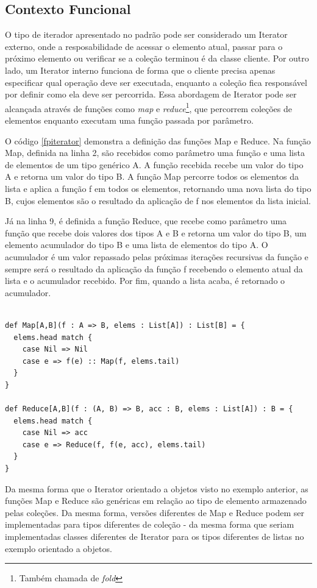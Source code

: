\subsection*{Contexto Funcional}

O tipo de iterador apresentado no padrão pode 
ser considerado um Iterator externo, onde a 
resposabilidade de acessar o elemento atual, 
passar para o próximo elemento ou verificar se 
a coleção terminou é da classe cliente. Por 
outro lado, um Iterator interno funciona de forma 
que o cliente precisa apenas especificar qual 
operação deve ser executada, enquanto a 
coleção fica responsável por definir como ela 
deve ser percorrida. Essa abordagem de Iterator 
pode ser alcançada através de funções como  
\textit{map} e \textit{reduce}\footnote{Também 
chamada de \textit{fold}}, que percorrem coleções 
de elementos enquanto executam uma função 
passada por parâmetro.\cite{iteratoressence}

O código \ref{fpiterator} demonstra a definição 
das funções Map e Reduce. Na função Map, definida 
na linha 2, são recebidos como parâmetro uma 
função e uma lista de elementos de um tipo 
genérico A. A função recebida recebe um valor 
do tipo A e retorna um valor do tipo B. A função 
Map percorre todos os elementos da lista e 
aplica a função f em todos os elementos, 
retornando uma nova lista do tipo B, cujos 
elementos são o resultado da aplicação de f nos 
elementos da lista inicial.

Já na linha 9, é definida a função Reduce, que 
recebe como parâmetro uma função que recebe dois 
valores dos tipos A e B e retorna um valor do 
tipo B, um elemento acumulador do tipo B e uma 
lista de elementos do tipo A. O acumulador 
é um valor repassado pelas próximas iterações 
recursivas da função e sempre será o resultado 
da aplicação da função f recebendo o elemento 
atual da lista e o acumulador recebido. 
Por fim, quando a lista acaba, é retornado o 
acumulador. 

\begin{lstlisting}[caption={Exemplos de Iterator: Map e Reduce},label=fpiterator]
    
def Map[A,B](f : A => B, elems : List[A]) : List[B] = {
  elems.head match {
    case Nil => Nil
    case e => f(e) :: Map(f, elems.tail)
  }
}

def Reduce[A,B](f : (A, B) => B, acc : B, elems : List[A]) : B = {
  elems.head match {
    case Nil => acc
    case e => Reduce(f, f(e, acc), elems.tail)
  }
}

\end{lstlisting}

Da mesma forma que o Iterator orientado a 
objetos visto no exemplo anterior, as funções 
Map e Reduce são genéricas em relação ao tipo 
de elemento armazenado pelas coleções. Da 
mesma forma, versões diferentes de Map e 
Reduce podem ser implementadas para tipos 
diferentes de coleção - da mesma forma que 
seriam implementadas classes diferentes de 
Iterator para os tipos diferentes de listas 
no exemplo orientado a objetos. 
